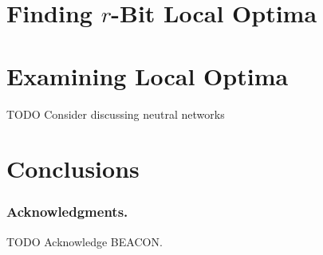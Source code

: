 \documentclass[runningheads,a4paper]{llncs}
\begin{document}
\section{Finding $r$-Bit Local Optima}

\section{Examining Local Optima}

TODO Consider discussing neutral networks

\section{Conclusions}

\subsubsection*{Acknowledgments.} TODO Acknowledge BEACON.



\end{document}
